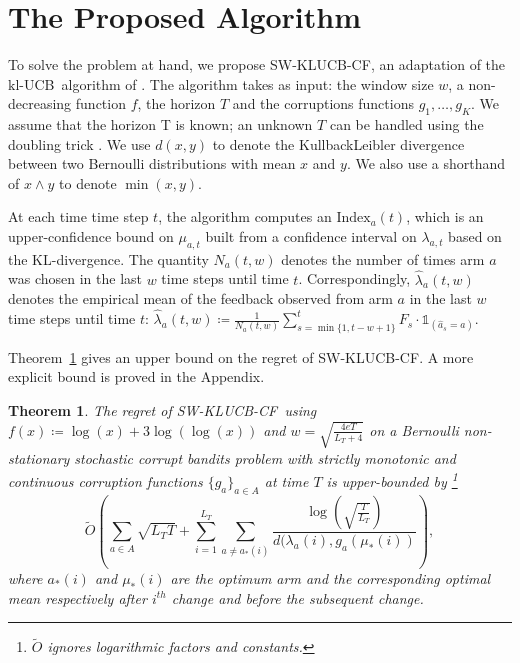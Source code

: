 \documentclass[letterpaper]{article} %
\newcommand{\ind}{\mathds{1}}
\newcommand{\ArmAt}{\hat{a}}
\newcommand{\defined}{\coloneqq}
\newcommand{\SWKLUCBCF}{\textsc{SW-KLUCB-CF}}
\newcommand{\KLUCB}{$\mathrm{kl}$-\textsc{UCB}}
\newcommand{\cB}{\mathcal{B}}
\newcommand{\optMeanAtIChanges}[1]{\mu_{*}(#1)}
\newcommand{\MeanFeAtIChanges}[2]{\lambda_#1(#2)}
\newcommand{\optArmAtIChanges}[1]{a_{*}(#1)}
\newcommand{\meanReward}[2]{\mu_{#1, #2}}
\newcommand{\meanFeedback}[2]{\lambda_{#1, #2}}
\newcommand{\numChanges}{L}
\newcommand{\windowsize}{w}
\newtheorem{myTheorem}{Theorem}
\begin{document}
\section{The Proposed Algorithm}
To solve the problem at hand, we propose \SWKLUCBCF,
an adaptation of the \KLUCB \ algorithm of \citet{KLUCBJournal}. 
The algorithm takes as input: the window size $\windowsize$, a non-decreasing function $f$, the horizon $T$ and the corruptions functions $g_1, \dots, g_K$. We assume that the horizon T is known; an unknown $T$ can be handled using the doubling trick \citep{besson:hal-01736357}. We use $d(x,y)$ to denote the KullbackLeibler divergence between two Bernoulli distributions with mean $x$ and $y$. 
We also use a shorthand of $x \wedge y$ to denote $\min(x,y)$.


At each time time step $t$, the algorithm computes an $\mathrm{Index}_a(t)$, which is an upper-confidence bound on $\meanReward{a}{t}$ built from a confidence interval on $\meanFeedback{a}{t}$ based on the KL-divergence. 
The quantity $N_a(t, \windowsize)$ denotes the number of times arm $a$ was chosen in the last $\windowsize$ time steps until time $t$.
Correspondingly, $\hat{\lambda}_a(t, \windowsize)$ denotes the empirical mean of the feedback observed from arm $a$ in the last $\windowsize$ time steps until time $t$: $\hat{\lambda}_a(t, w) \defined \frac{1}{N_a(t, \windowsize)}\sum_{s=\min\{1, t-\windowsize+1\}}^t F_s \cdot \ind_{(\ArmAt_s = a)}$. 



Theorem~\ref{MainTheorem1}  gives an upper bound on the regret of \SWKLUCBCF. A more explicit bound is proved in the Appendix.

\begin{myTheorem}
\label{MainTheorem1} 
The regret of \SWKLUCBCF \ using  $f(x) \defined \log(x)+3\log(\log(x))$ and $\windowsize = \sqrt{ \frac{4eT}{\numChanges_T + 4}}$ on a  
Bernoulli non-stationary stochastic corrupt bandits problem with strictly monotonic and continuous corruption functions $\{g_a\}_{a \in A}$ at time $T$ is upper-bounded by \footnote{$\tilde{O}$ ignores logarithmic factors and constants.}
$$
\tilde{O}\left( \sum_{a \in A} \sqrt{\numChanges_T T} + \sum_{i=1}^{\numChanges_T} \sum_{a \neq \optArmAtIChanges{i}} \frac{\log{\left(  \sqrt{ \frac{T}{\numChanges_T}} \right)}}{d(\MeanFeAtIChanges{a}{i},g_a(\optMeanAtIChanges{i})} \right),
$$
where $\optArmAtIChanges{i}$ and $\optMeanAtIChanges{i}$ are the optimum arm and the corresponding optimal mean respectively after $i^{th}$ change and before the subsequent change.
\end{myTheorem}
\end{document}
